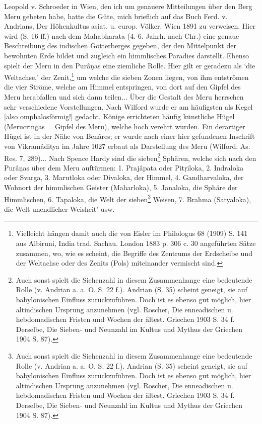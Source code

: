 \documentclass[a4paper, 11pt, oneside]{article}
\begin{document}
Leopold v. Schroeder in Wien, den ich um genauere Mitteilungen über den Berg Meru gebeten habe, hatte die Güte, mich brieflich auf das Buch Ferd. v. Andrians, Der Höhenkultus asiat. u. europ. Völker. Wien 1891 zu verweisen. Hier wird (S. 16 ff.) nach dem Mahabharata (4.-6. Jahrh. nach Chr.) eine genaue Beschreibung des indischen Götterberges gegeben, der den Mittelpunkt der bewohnten Erde bildet und zugleich ein himmlisches Paradies darstellt. Ebenso spielt der Meru in den Purâṇas eine ziemliche Rolle. Hier gilt er geradezu als `die Weltachse,' der Zenit,\footnote{Vielleicht hängen damit auch die von Eisler im Philologus 68 (1909) S. 141 aus Albiruni, India trad. Sachau. London 1883 p. 306 c. 30 angeführten Sätze zusammen, wo, wie es scheint, die Begriffe des Zentrums der Erdscheibe und der Weltachse oder des Zenits (Pols) miteinander vermischt sind.} um welche die sieben Zonen liegen, von ihm entströmen die vier Ströme, welche am Himmel entspringen, von dort auf den Gipfel des Meru herabfallen und sich dann teilen... Über die Gestalt des Meru herrschen sehr verschiedene Vorstellungen. Nach Wilford wurde er am häufigsten als Kegel [also omphalosförmig!] gedacht. Könige errichteten häufig künstliche Hügel (Merucringas = Gipfel des Meru), welche hoch verehrt wurden. Ein derartiger Hügel ist in der Nähe von Benâres; er wurde nach einer hier gefundenen Inschrift von Vikramâditya im Jahre 1027 erbaut als Darstellung des Meru (Wilford, As. Res. 7, 289)... Nach Spence Hardy sind die sieben\footnote{Auch sonst spielt die Siehenzahl in diesem Zusammenhange eine bedeutende Rolle (v. Andrian a. a. O. S. 22 f.). Andrian (S. 35) scheint geneigt, sie auf babylonischen Einfluss zurückzuführen. Doch ist es ebenso gut möglich, hier altindischen Ursprung anzunehmen (vgl. Roscher, Die enneadischen u. hebdomadischen Fristen und Wochen der ältest. Griechen 1903 S. 34 f. Derselbe, Die Sieben- und Neunzahl im Kultus und Mythus der Griechen 1904 S. 87).} Sphären, welche sich nach den Purâṇas über dem Meru auftürmen: 1. Prajâpata oder Pitṛiloka, 2. Indraloka oder Svarga, 3. Marutloka oder Divaloka, der Himmel, 4. Gandharvaloka, der Wohnort der himmlischen Geister (Maharloka), 5. Janaloka, die Sphäre der Himmlischen, 6. Tapaloka, die Welt der sieben\footnote{Auch sonst spielt die Siehenzahl in diesem Zusammenhange eine bedeutende Rolle (v. Andrian a. a. O. S. 22 f.). Andrian (S. 35) scheint geneigt, sie auf babylonischen Einfluss zurückzuführen. Doch ist es ebenso gut möglich, hier altindischen Ursprung anzunehmen (vgl. Roscher, Die enneadischen u. hebdomadischen Fristen und Wochen der ältest. Griechen 1903 S. 34 f. Derselbe, Die Sieben- und Neunzahl im Kultus und Mythus der Griechen 1904 S. 87).} Weisen, 7. Brahma (Satyaloka), die Welt unendlicher Weisheit' usw.
\end{document}
